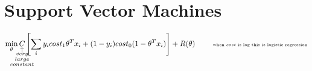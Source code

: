 \section{Support Vector Machines}
\begin{slide}[SVM]
	$$\min_\theta \explain{C}{very\\large\\constant}\left[ \sum_i y_icost_1\theta^Tx_i + (1-y_i) cost_0(1-\theta^Tx_i)\right] + R(\theta) \qquad \text{ \tiny when $cost$ is $\log$ this is logistic regression}$$
\end{slide}
